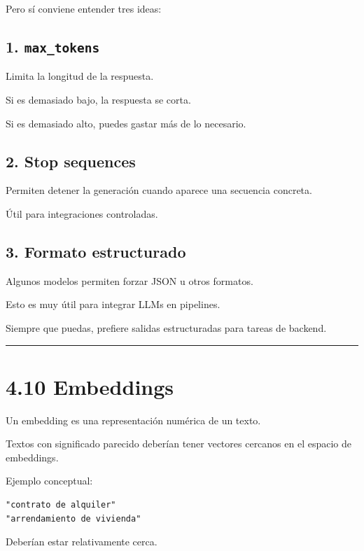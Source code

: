 Pero sí conviene entender tres ideas:

\subsection{\texorpdfstring{1.
\texttt{max\_tokens}}{1. max\_tokens}}\label{max_tokens}

Limita la longitud de la respuesta.

Si es demasiado bajo, la respuesta se corta.

Si es demasiado alto, puedes gastar más de lo necesario.

\subsection{2. Stop sequences}\label{stop-sequences}

Permiten detener la generación cuando aparece una secuencia concreta.

Útil para integraciones controladas.

\subsection{3. Formato estructurado}\label{formato-estructurado}

Algunos modelos permiten forzar JSON u otros formatos.

Esto es muy útil para integrar LLMs en pipelines.

Siempre que puedas, prefiere salidas estructuradas para tareas de
backend.

\begin{center}\rule{0.5\linewidth}{0.5pt}\end{center}

\section{4.10 Embeddings}\label{embeddings}

Un embedding es una representación numérica de un texto.

Textos con significado parecido deberían tener vectores cercanos en el
espacio de embeddings.

Ejemplo conceptual:

\begin{lstlisting}
"contrato de alquiler"
"arrendamiento de vivienda"
\end{lstlisting}

Deberían estar relativamente cerca.

